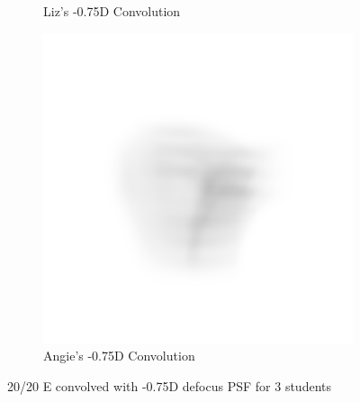 \documentclass{article}
\begin{document}
\begin{figure}[H]
\begin{subfigure}{.3\textwidth}
  \caption{Liz's -0.75D Convolution}
  \label{fig:lizn075d}
\end{subfigure}
\begin{subfigure}{.3\textwidth}
  \centering
  \includegraphics[width=1\linewidth]{Angie_R_0526_1_500_zer_-075_5_PSF_convE.png}
  \caption{Angie's -0.75D Convolution}
  \label{fig:angien075d}
\end{subfigure}

\caption{20/20 E convolved with -0.75D defocus PSF for 3 students}
\label{fig:Defocus_n075D}
\end{figure}

\clearpage
\end{document}
